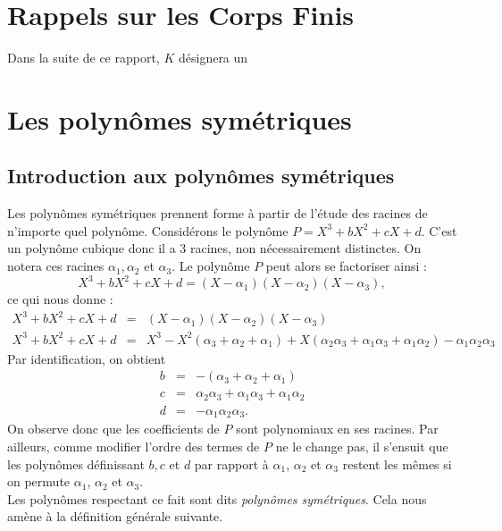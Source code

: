 \documentclass[12pt]{article}
\theoremstyle{remark}\newtheorem{note}{Note}
\theoremstyle{remark}\newtheorem{nota}{Notation}
\theoremstyle{definition}
\begin{document}

\tableofcontents
\pagebreak


\section{Rappels sur les Corps Finis} %














Dans la suite de ce rapport, $K$ désignera un %
\pagebreak

\section{Les polynômes symétriques}

\subsection{Introduction aux polynômes symétriques}
Les polynômes symétriques prennent forme à partir de l'étude des racines de n'importe quel polynôme. Considérons le polynôme $P=X^3 + bX^2 + cX + d$. C'est un polynôme cubique donc il a $3$ racines, non nécessairement distinctes. On notera ces racines $\alpha_1 , \alpha_2$ et $\alpha_3$.
Le polynôme $P$ peut alors se factoriser ainsi :
$$X^3 + bX^2 + cX + d = (X - \alpha_1)(X - \alpha_2)(X - \alpha_3),$$
ce qui nous donne :
\begin{eqnarray}
X^3 + bX^2 + cX + d &=& (X - \alpha_1)(X - \alpha_2)(X - \alpha_3) \nonumber \\
X^3 + bX^2 + cX + d &=& X^3 - X^2(\alpha_3 + \alpha_2 + \alpha_1) + X(\alpha_2 \alpha_3 + \alpha_1 \alpha_3 + \alpha_1 \alpha_2) - \alpha_1 \alpha_2 \alpha_3 \nonumber
\end{eqnarray}
Par identification, on obtient 
\begin{eqnarray}
b &=& -(\alpha_3 + \alpha_2 + \alpha_1) \nonumber \\
c &=& \alpha_2 \alpha_3 + \alpha_1 \alpha_3 + \alpha_1 \alpha_2 \nonumber \\
d &=& - \alpha_1 \alpha_2 \alpha_3. \nonumber 
\end{eqnarray}
On observe donc que les coefficients de $P$ sont polynomiaux en ses racines. Par ailleurs, comme modifier l'ordre des termes de $P$ ne le change pas, il s'ensuit que les polynômes définissant $b,c$ et $d$ par rapport à $\alpha_1$, $\alpha_2$ et $\alpha_3$ restent les mêmes si on permute $\alpha_1$, $\alpha_2$ et $\alpha_3$.\\
Les polynômes respectant ce fait sont dits \textit{polynômes symétriques}. Cela nous amène à la définition générale suivante.\\
\end{document}
